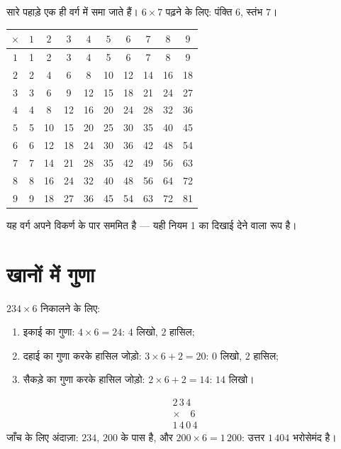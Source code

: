 \begin{example}[पहाड़ों का वर्ग]\label{ex:g3:mult:table}
सारे पहाड़े एक ही वर्ग में समा जाते हैं। $6 \times 7$ पढ़ने के
लिए: पंक्ति $6$, स्तंभ $7$।
\begin{center}
\renewcommand{\arraystretch}{1.15}
\begin{tabular}{c|ccccccccc}
$\times$ & $1$ & $2$ & $3$ & $4$ & $5$ & $6$ & $7$ & $8$ & $9$ \\
\hline
$1$ & 1 & 2 & 3 & 4 & 5 & 6 & 7 & 8 & 9 \\
$2$ & 2 & 4 & 6 & 8 & 10 & 12 & 14 & 16 & 18 \\
$3$ & 3 & 6 & 9 & 12 & 15 & 18 & 21 & 24 & 27 \\
$4$ & 4 & 8 & 12 & 16 & 20 & 24 & 28 & 32 & 36 \\
$5$ & 5 & 10 & 15 & 20 & 25 & 30 & 35 & 40 & 45 \\
$6$ & 6 & 12 & 18 & 24 & 30 & 36 & 42 & 48 & 54 \\
$7$ & 7 & 14 & 21 & 28 & 35 & 42 & 49 & 56 & 63 \\
$8$ & 8 & 16 & 24 & 32 & 40 & 48 & 56 & 64 & 72 \\
$9$ & 9 & 18 & 27 & 36 & 45 & 54 & 63 & 72 & 81 \\
\end{tabular}
\end{center}
यह वर्ग अपने विकर्ण के पार सममित है --- यही नियम 1 का दिखाई
देने वाला रूप है।
\end{example}

\section{खानों में गुणा}

\begin{method}[एक अंक की संख्या से गुणा]\label{met:g3:mult:column}
$234 \times 6$ निकालने के लिए:
\begin{enumerate}
  \item इकाई का गुणा: $4 \times 6 = 24$: $4$ लिखो, $2$ हासिल;
  \item दहाई का गुणा करके हासिल जोड़ो:
        $3 \times 6 + 2 = 20$: $0$ लिखो, $2$ हासिल;
  \item सैकड़े का गुणा करके हासिल जोड़ो:
        $2 \times 6 + 2 = 14$: $14$ लिखो।
\end{enumerate}
\[
\begin{array}{r}
2\,3\,4 \\
\times \quad 6 \\
\hline
1\,4\,0\,4
\end{array}
\]
जाँच के लिए अंदाज़ा: $234$, $200$ के पास है, और
$200 \times 6 = 1\,200$: उत्तर $1\,404$ भरोसेमंद है।
\end{method}

